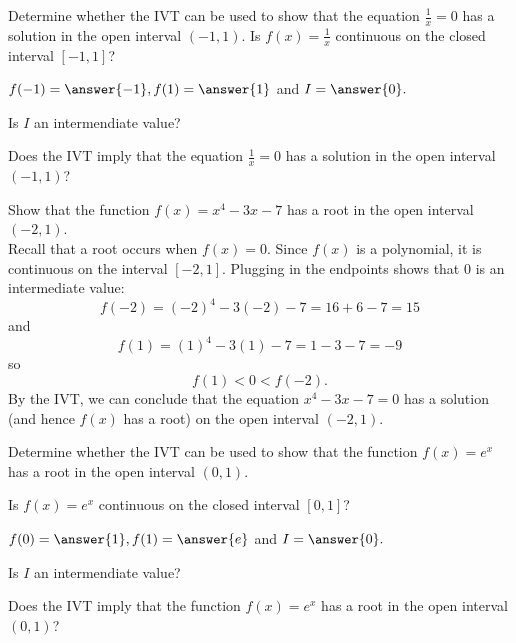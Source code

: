 \documentclass{ximera}
\begin{document}
\begin{problem}
Determine whether the IVT can be used to show that the equation $\frac{1}{x} = 0$ has a solution in the open interval $(-1, 1).$
Is $f(x) = \frac{1}{x}$ continuous on the closed interval $[-1,1]$? 
\begin{center}
\begin{multipleChoice}
\end{multipleChoice}
\end{center}


$f(-1) = \answer{-1}, f(1) = \answer{1}$ and $I = \answer{0}.$

Is $I$ an intermendiate value? 
\begin{multipleChoice}
\end{multipleChoice}

Does the IVT imply that the equation $\frac{1}{x} = 0$ has a solution in the open interval $(-1, 1)$?
\begin{multipleChoice}
\end{multipleChoice}
\end{problem}

\begin{example}  %
Show that the function $f(x) = x^4 - 3x - 7$ has a root in the open interval $(-2, 1)$.\\

Recall that a root occurs when $f(x) = 0$. Since $f(x)$ is a polynomial, it is continuous on the interval 
$[-2, 1]$. Plugging in the endpoints shows that 0 is an intermediate value:
\[f(-2) = (-2)^4 - 3(-2) - 7 = 16 + 6 - 7 = 15 \]
and
\[f(1) = (1)^4 - 3(1) - 7 = 1 -3 - 7 = -9 \]
so 
\[f(1) < 0 < f(-2).\]
By the IVT, we can conclude that the equation $x^4 - 3x - 7 = 0$ has a solution (and hence $f(x)$ has a root) 
on the open interval $(-2, 1)$.
\end{example}


\begin{problem}
Determine whether the IVT can be used to show that the function $f(x) = e^x$ has a root in the open interval $(0,1)$.

Is $f(x) = e^x$ continuous on the closed interval $[0,1]$? 
\begin{center}
\begin{multipleChoice}
\end{multipleChoice}
\end{center}


$f(0) = \answer{1}, f(1) = \answer{e}$ and $I = \answer{0}.$

Is $I$ an intermendiate value? 
\begin{multipleChoice}
\end{multipleChoice}

Does the IVT imply that the function $f(x) = e^x$ has a root in the open interval $(0, 1)$?
\begin{multipleChoice}
\end{multipleChoice}
\end{problem}
\end{document}
